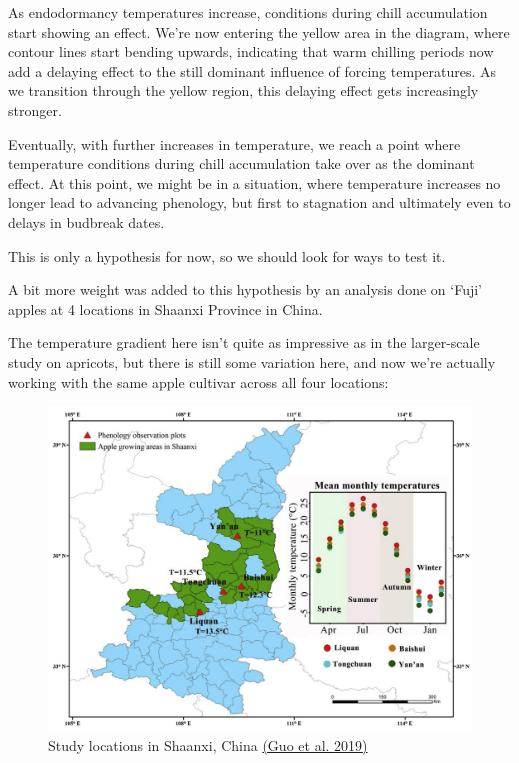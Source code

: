 \documentclass[
]{book}
\begin{document}
As endodormancy temperatures increase, conditions during chill accumulation start showing an effect. We're now entering the yellow area in the diagram, where contour lines start bending upwards, indicating that warm chilling periods now add a delaying effect to the still dominant influence of forcing temperatures. As we transition through the yellow region, this delaying effect gets increasingly stronger.

Eventually, with further increases in temperature, we reach a point where temperature conditions during chill accumulation take over as the dominant effect. At this point, we might be in a situation, where temperature increases no longer lead to advancing phenology, but first to stagnation and ultimately even to delays in budbreak dates.

This is only a hypothesis for now, so we should look for ways to test it.

A bit more weight was added to this hypothesis by an analysis done on `Fuji' apples at 4 locations in Shaanxi Province in China.

The temperature gradient here isn't quite as impressive as in the larger-scale study on apricots, but there is still some variation here, and now we're actually working with the same apple cultivar across all four locations:

\begin{figure}
\centering
\includegraphics{pictures/temps_Shaanxi.jpg}
\caption{Study locations in Shaanxi, China \href{https://doi.org/10.1016/j.agrformet.2019.01.038}{(Guo et al. \protect\hyperlink{ref-guo2019distribution}{2019})}}
\end{figure}
\end{document}

